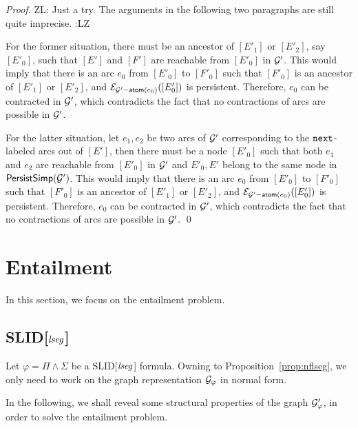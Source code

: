 \documentclass{llncs}
\newcommand{\zhilin}[1]{\color{red} {ZL: #1 :LZ} \color{black}}
\newcommand{\tl}[1]{\color{blue} {TL: #1 :LT} \color{black}}
\begin{document}
\begin{proof}
\zhilin{Just a try. The arguments in the following two paragraphs are still quite imprecise.}

For the former situation, there must be an ancestor of $[E'_1]$ or $[E'_2]$, say $[E'_0]$, such that $[E']$ and $[F']$ are reachable from $[E'_0]$ in $\mathcal{G}'$. This would imply that there is an arc $e_0$ from $[E'_0]$ to $[F'_0]$ such that $[F'_0]$ is an ancestor of $[E'_1]$ or $[E'_2]$, and $\mathcal{E}_{\mathcal{G}'-\mathsf{atom}(e_0)}([E'_0])$ is persistent. Therefore, $e_0$ can be contracted in $\mathcal{G}'$, which contradicts the fact that no contractions of arcs are possible in $\mathcal{G}'$.

For the latter situation, let $e_1,e_2$ be two arcs of $\mathcal{G}'$ corresponding to the $\mathtt{next}$-labeled arcs out of $[E']$, then there must be a node $[E'_0]$ such that both $e_1$ and $e_2$ are reachable from $[E'_0]$ in $\mathcal{G}'$ and $E'_0, E'$ belong to the same node in ${\sf PersistSimp}(\mathcal{G}')$. This would imply that there is an arc $e_0$ from $[E'_0]$ to $[F'_0]$ such that $[F'_0]$ is an ancestor of $[E'_1]$ or $[E'_2]$, and $\mathcal{E}_{\mathcal{G}'-\mathsf{atom}(e_0)}([E'_0])$ is persistent. Therefore, $e_0$ can be contracted in $\mathcal{G}'$, which contradicts the fact that no contractions of arcs are possible in $\mathcal{G}'$.
\qed
\end{proof}

\section{Entailment}

In this section, we focus on the entailment problem.
\subsection{SLID[$\mathit{lseg}$]}


Let $\varphi = \Pi \wedge \Sigma$ be a SLID[$\mathit{lseg}$] formula. Owning to Proposition~\ref{prop:nflseg}, we only need to work on the graph representation $\mathcal{G}_\varphi$ in  normal form.

In the following, we shall reveal some structural properties of the graph $\mathcal{G}'_\varphi$, in order to solve the entailment problem.

\end{document}
